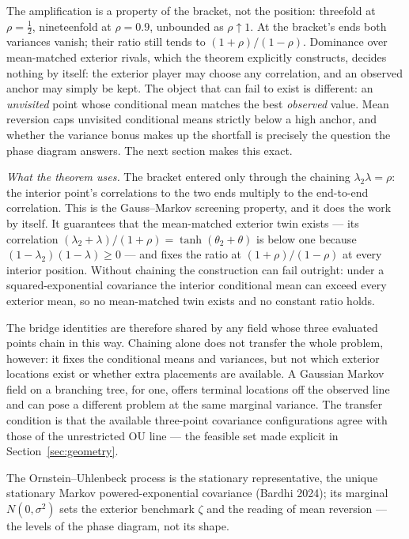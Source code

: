 \documentclass[11pt]{article}
\theoremstyle{itheads}
\begin{document}
The amplification is a property of the bracket, not the position:
threefold at $\rho=\tfrac12$, nineteenfold at $\rho=0.9$, unbounded as
$\rho\uparrow 1$. At the bracket's ends both variances vanish; their
ratio still tends to $(1+\rho)/(1-\rho)$. Dominance over mean-matched
exterior rivals, which the theorem explicitly constructs, decides
nothing by itself: the exterior player may choose any
correlation, and an observed anchor may simply be kept. The object
that can fail to exist is different: an \emph{unvisited} point whose
conditional mean matches the best \emph{observed} value. Mean
reversion caps unvisited conditional means strictly below a high
anchor, and whether the variance bonus makes up the shortfall is
precisely the question the phase diagram answers. The next section
makes this exact.

\medskip\noindent\emph{What the theorem uses.} The bracket entered
only through the chaining $\lambda_2\lambda=\rho$: the interior
point's correlations to the two ends multiply to the end-to-end
correlation. This is the Gauss--Markov screening property, and it does
the work by itself. It guarantees that the mean-matched exterior twin
exists --- its correlation $(\lambda_2+\lambda)/(1+\rho)
=\tanh(\theta_2+\theta)$ is below one because
$(1-\lambda_2)(1-\lambda)\ge 0$ --- and fixes the ratio at
$(1+\rho)/(1-\rho)$ at every interior position. Without chaining the
construction can fail outright: under a squared-exponential covariance
the interior conditional mean can exceed every exterior mean, so no
mean-matched twin exists and no constant ratio holds.

The bridge identities are therefore shared by any field whose three
evaluated points chain in this way. Chaining alone does not transfer
the whole problem, however: it fixes the conditional means and
variances, but not which exterior locations exist or whether extra
placements are available. A Gaussian Markov field on a branching tree,
for one, offers terminal locations off the observed line and can pose a
different problem at the same marginal variance. The transfer condition
is that the available three-point covariance configurations agree with
those of the unrestricted OU line --- the feasible set made explicit in
Section~\ref{sec:geometry}.

The Ornstein--Uhlenbeck process is the stationary representative, the
unique stationary Markov powered-exponential covariance (Bardhi 2024);
its marginal $N(0,\sigma^{2})$ sets the exterior benchmark $\zeta$ and
the reading of mean reversion --- the levels of the phase diagram, not
its shape.
\end{document}
